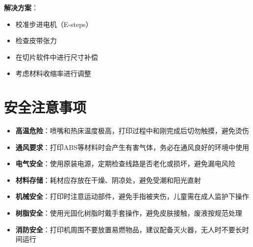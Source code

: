 \documentclass[12pt,UTF8]{ctexbook}
\begin{document}
\textbf{解决方案}：
\begin{itemize}
\item 校准步进电机（E-steps）
\item 检查皮带张力
\item 在切片软件中进行尺寸补偿
\item 考虑材料收缩率进行调整
\end{itemize}

\section{安全注意事项}

\begin{itemize}
\item \textbf{高温危险}：喷嘴和热床温度极高，打印过程中和刚完成后切勿触摸，避免烫伤
\item \textbf{通风要求}：打印ABS等材料时会产生有害气体，务必在通风良好的环境中使用
\item \textbf{电气安全}：使用原装电源，定期检查线路是否老化或损坏，避免漏电风险
\item \textbf{材料存储}：耗材应存放在干燥、阴凉处，避免受潮和阳光直射
\item \textbf{机械安全}：打印时注意运动部件，避免手指被夹伤，儿童需在成人监护下操作
\item \textbf{树脂安全}：使用光固化树脂时戴手套操作，避免皮肤接触，废液按规范处理
\item \textbf{消防安全}：打印机周围不要放置易燃物品，建议配备灭火器，无人时不要长时间运行
\end{itemize}
\end{document}
